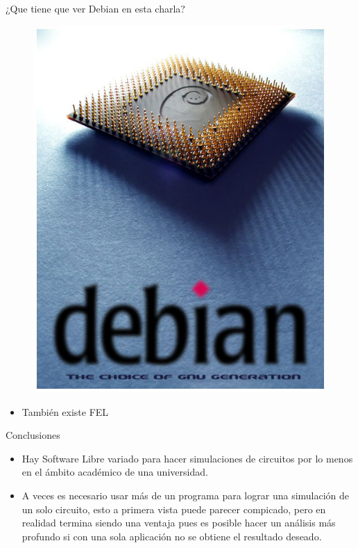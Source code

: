 \documentclass{beamer}
\begin{document}
\begin{frame}{¿Que tiene que ver Debian en esta charla?}
  \begin{figure}
    \includegraphics[scale=0.32]{img/choice.jpg}
  \end{figure}
    \begin{itemize}
  \item También existe FEL
  \end{itemize}
\end{frame}

\begin{frame}{Conclusiones}
  \begin{block}{}
    \begin{itemize}
    \item Hay Software Libre variado para hacer simulaciones de circuitos por lo menos en el ámbito académico de una universidad.
    \item A veces es necesario usar más de un programa para lograr una simulación de un solo circuito, esto a primera vista puede parecer compicado, pero en realidad termina siendo una ventaja pues es posible hacer un análisis más profundo si con una sola aplicación no se obtiene el resultado deseado.
    \end{itemize}
  \end{block}
\end{frame}
\end{document}
